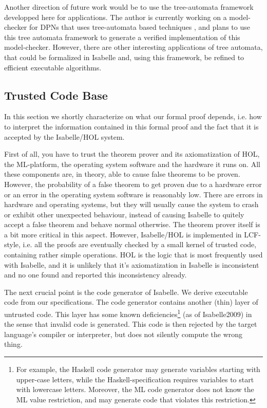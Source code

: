 Another direction of future work would be to use the tree-automata framework developped here for applications. 
The author is currently working on a model-checker for DPNs that uses tree-automata based techniques \cite{L09_kps}, and plans to use this
tree automata framework to generate a verified implementation of this model-checker.
However, there are other interesting applications of tree automata, that could be formalized in Isabelle and, using this framework, be refined to 
efficient executable algorithms.

\subsection {Trusted Code Base}
  In this section we shortly characterize on what our formal proof depends, i.e. how to interpret the information contained in this formal proof and the fact that it
  is accepted by the Isabelle/HOL system.

  First of all, you have to trust the theorem prover and its axiomatization of HOL, the ML-platform, the operating system software and the hardware it runs on.
  All these components are, in theory, able to cause false theorems to be proven. However, the probability of a false theorem to get proven due to a hardware error 
  or an error in the operating system software is reasonably low. There are errors in hardware and operating systems, but they will usually cause the system to crash 
  or exhibit other unexpected behaviour, instead of causing Isabelle to quitely accept a false theorem and behave normal otherwise. The theorem prover itself is a bit more critical in this aspect. However, Isabelle/HOL is implemented in LCF-style, i.e. all the proofs are eventually checked by a small kernel of trusted code, containing rather simple operations. HOL is the logic that is most frequently used with Isabelle, and it is unlikely that it's axiomatization in Isabelle is inconsistent and no one found and reported this inconsistency already.

  The next crucial point is the code generator of Isabelle. We derive executable code from our specifications. The code generator contains another (thin) layer of untrusted code. This layer has some known deficiencies\footnote{For example, the Haskell code generator may generate variables starting with upper-case letters, while the Haskell-specification requires variables to start with lowercase letters. Moreover, the ML code generator does not know the ML value restriction, and may generate code that violates this restriction.} (as of Isabelle2009) in the sense that invalid code is generated. This code is then rejected by the target language's compiler or interpreter, but does not silently compute the wrong thing. 

